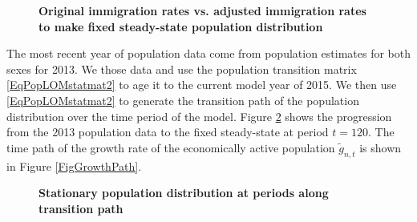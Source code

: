   \begin{figure}[htbp]\centering \captionsetup{width=4.0in}
    \caption{\label{FigImmRateChg}\textbf{Original immigration rates vs. adjusted immigration rates to make fixed steady-state population distribution}}
  \end{figure}

  The most recent year of population data come from \citet{Census:2015} population estimates for both sexes for 2013. We those data and use the population transition matrix \eqref{EqPopLOMstatmat2} to age it to the current model year of 2015. We then use \eqref{EqPopLOMstatmat2} to generate the transition path of the population distribution over the time period of the model. Figure \ref{FigPopDistPath} shows the progression from the 2013 population data to the fixed steady-state at period $t=120$. The time path of the growth rate of the economically active population $\tilde{g}_{n,t}$ is shown in Figure \ref{FigGrowthPath}.

  \begin{figure}[htbp]\centering \captionsetup{width=4.0in}
    \caption{\label{FigPopDistPath}\textbf{Stationary population distribution at periods along transition path}}
  \end{figure}

